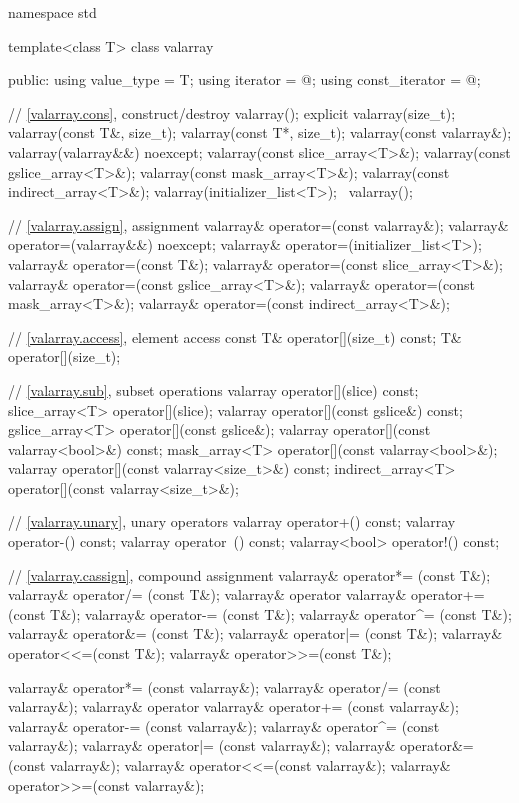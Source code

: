 %
\begin{codeblock}
namespace std {
  template<class T> class valarray {
  public:
    using value_type     = T;
    using iterator       = @\unspec@;
    using const_iterator = @\unspec@;

    // \ref{valarray.cons}, construct/destroy
    valarray();
    explicit valarray(size_t);
    valarray(const T&, size_t);
    valarray(const T*, size_t);
    valarray(const valarray&);
    valarray(valarray&&) noexcept;
    valarray(const slice_array<T>&);
    valarray(const gslice_array<T>&);
    valarray(const mask_array<T>&);
    valarray(const indirect_array<T>&);
    valarray(initializer_list<T>);
    ~valarray();

    // \ref{valarray.assign}, assignment
    valarray& operator=(const valarray&);
    valarray& operator=(valarray&&) noexcept;
    valarray& operator=(initializer_list<T>);
    valarray& operator=(const T&);
    valarray& operator=(const slice_array<T>&);
    valarray& operator=(const gslice_array<T>&);
    valarray& operator=(const mask_array<T>&);
    valarray& operator=(const indirect_array<T>&);

    // \ref{valarray.access}, element access
    const T&          operator[](size_t) const;
    T&                operator[](size_t);

    // \ref{valarray.sub}, subset operations
    valarray          operator[](slice) const;
    slice_array<T>    operator[](slice);
    valarray          operator[](const gslice&) const;
    gslice_array<T>   operator[](const gslice&);
    valarray          operator[](const valarray<bool>&) const;
    mask_array<T>     operator[](const valarray<bool>&);
    valarray          operator[](const valarray<size_t>&) const;
    indirect_array<T> operator[](const valarray<size_t>&);

    // \ref{valarray.unary}, unary operators
    valarray operator+() const;
    valarray operator-() const;
    valarray operator~() const;
    valarray<bool> operator!() const;

    // \ref{valarray.cassign}, compound assignment
    valarray& operator*= (const T&);
    valarray& operator/= (const T&);
    valarray& operator%
    valarray& operator+= (const T&);
    valarray& operator-= (const T&);
    valarray& operator^= (const T&);
    valarray& operator&= (const T&);
    valarray& operator|= (const T&);
    valarray& operator<<=(const T&);
    valarray& operator>>=(const T&);

    valarray& operator*= (const valarray&);
    valarray& operator/= (const valarray&);
    valarray& operator%
    valarray& operator+= (const valarray&);
    valarray& operator-= (const valarray&);
    valarray& operator^= (const valarray&);
    valarray& operator|= (const valarray&);
    valarray& operator&= (const valarray&);
    valarray& operator<<=(const valarray&);
    valarray& operator>>=(const valarray&);

}}
\end{codeblock}
